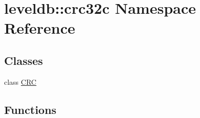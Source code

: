 \hypertarget{namespaceleveldb_1_1crc32c}{\section{leveldb\-:\-:crc32c Namespace Reference}
\label{namespaceleveldb_1_1crc32c}
}
\subsection*{Classes}
\begin{DoxyCompactItemize}
\item 
class \hyperlink{classleveldb_1_1crc32c_1_1_c_r_c}{C\-R\-C}
\end{DoxyCompactItemize}
\subsection*{Functions}
